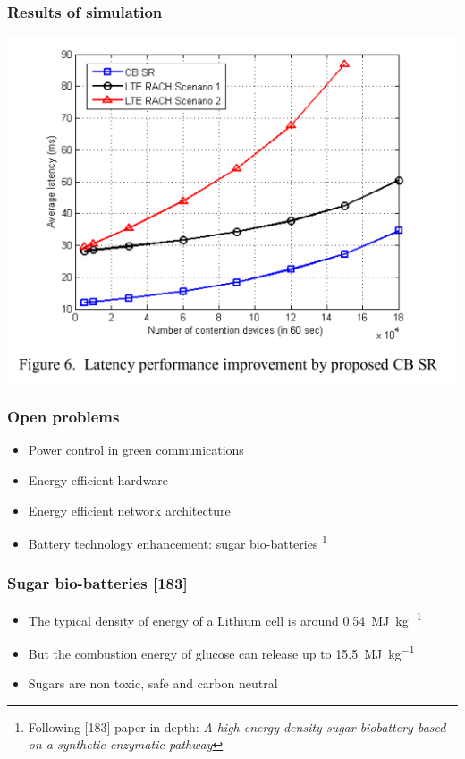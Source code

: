 \documentclass[a4paper,12pt,handout]{beamer}
\begin{document}
\begin{frame}
	\frametitle{Results of simulation}

	\begin{center}
	\includegraphics[scale=0.4]{cb-latency.png}
	\end{center}

\end{frame}
\note{}
\begin{frame}
\frametitle{Open problems}

\begin{itemize}
\item Power control in green communications
\item Energy efficient hardware
\item Energy efficient network architecture
\item Battery technology enhancement: sugar bio-batteries %
\footnote{Following [183] paper in depth: \textsl{A high-energy-density sugar 
biobattery based on a synthetic enzymatic pathway}}
\end{itemize}

\end{frame}
\note{}
\begin{frame}
\frametitle{Sugar bio-batteries [183]}

\begin{itemize}

	\item The typical density of energy of a Lithium cell is around 
	\SI{0.54}{\mega\joule\per\kilogram}

	\item But the combustion energy of glucose can release up to 
	\SI{15.5}{\mega\joule\per\kilogram}

	\item Sugars are non toxic, safe and carbon neutral

\end{itemize}
\end{frame}
\end{document}
